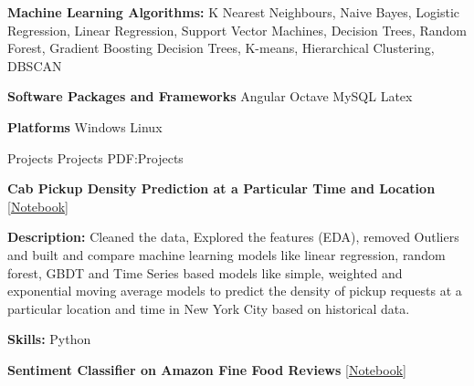\documentclass[letterpaper,MMMyyyy,nonstopmode]{simpleresumecv}
\begin{document}
\begin{Body}
        \BigGap
            
        \Entry
            \textbf{Machine Learning Algorithms:}
            K Nearest Neighbours, Naive Bayes, Logistic Regression, 
            Linear Regression, Support Vector Machines, Decision Trees, 
            Random Forest, Gradient Boosting Decision Trees, K-means, 
            Hierarchical Clustering, DBSCAN
        
        
        \BigGap
        
        
        \Entry
            \textbf{Software Packages and Frameworks}
            \SubBulletItem
                Angular
            \SubBulletItem
                Octave
            \SubBulletItem
                MySQL
            \SubBulletItem
                Latex
        
        
        \BigGap
        
        \Entry
            \textbf{Platforms}
            \SubBulletItem
                Windows
            \SubBulletItem
                Linux
    
    
    
    \Section
    {Projects}
    {Projects}
    {PDF:Projects}
    
        \Entry
            \textbf{Cab Pickup Density Prediction at a Particular Time and Location}
            [\href{http://bit.ly/PickupDensity}{Notebook}]

            \Gap

            \Item
                \textbf{Description:}
                Cleaned the data, Explored the features (EDA), 
                removed Outliers and built and compare machine learning models 
                like  linear regression, random forest, GBDT and Time Series 
                based models like simple, weighted and exponential moving average 
                models to predict the density of pickup requests at a 
                particular location and time in New York City based on historical data.
            
            \Gap

            \Item
                \textbf{Skills:}
                Python
        
        
        \BigGap
        
        \Entry
            \textbf{Sentiment Classifier on Amazon Fine Food Reviews}
            [\href{http://bit.ly/AmznSentimentClassifier}{Notebook}]


\end{Body}
\end{document}
